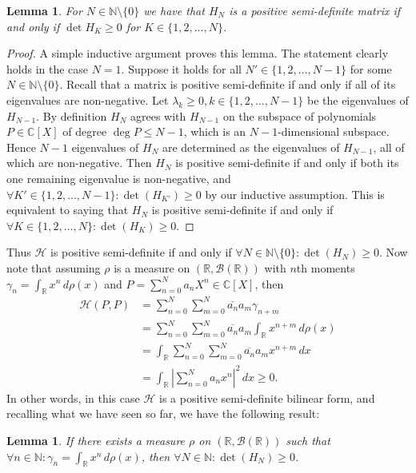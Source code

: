 \documentclass[12pt,oneside]{report}
\newtheorem{lem}[thm]{Lemma}
\begin{document}
\begin{lem}
    For $N \in \mathbb{N} \setminus \{ 0 \}$ we have that $H_{N}$ is a positive semi-definite matrix if and only if $\det H_{K} \geq 0$ for $K \in \{ 1, 2, \dots, N \}$.
\end{lem}
\begin{proof}
    A simple inductive argument proves this lemma. The statement clearly holds in the case $N = 1$. Suppose it holds for all $N' \in \{ 1,2,\dots,N-1 \}$ for some $N \in \mathbb{N} \setminus \{ 0 \}$. Recall that a matrix is positive semi-definite if and only if all of its eigenvalues are non-negative. Let $\lambda_{k} \geq 0, k \in \{ 1,2,\dots,N-1 \}$ be the eigenvalues of $H_{N-1}$. By definition $H_{N}$ agrees with $H_{N-1}$ on the subspace of polynomials $P \in \mathbb{C}[X]$ of degree $\deg P \leq N-1$, which is an $N-1$-dimensional subspace. Hence $N-1$ eigenvalues of $H_{N}$ are determined as the eigenvalues of $H_{N-1}$, all of which are non-negative. Then $H_{N}$ is positive semi-definite if and only if both its one remaining eigenvalue is non-negative, and $\forall K' \in \{ 1,2,\dots,N-1 \}: \det (H_{K'}) \geq 0$ by our inductive assumption. This is equivalent to saying that $H_{N}$ is positive semi-definite if and only if $\forall K \in \{ 1,2,\dots,N \}: \det(H_{K}) \geq 0$.
\end{proof}

Thus $\mathcal{H}$ is positive semi-definite if and only if $\forall N \in \mathbb{N} \setminus \{ 0 \}: \det(H_{N}) \geq 0$. Now note that assuming $\rho$ is a measure on $(\mathbb{R}, \mathcal{B}(\mathbb{R}))$ with $n$th moments $\gamma_{n} = \int _{\mathbb{R}} x^{n} \, d\rho(x)$ and $P = \sum_{n=0}^{N} a_{n}X^{n} \in \mathbb{C}[X]$, then
\begin{align}
\mathcal{H}(P,P) &= \sum_{n=0}^{N} \sum_{m=0}^{N} \overline{a_{n}}a_{m} \gamma_{n+m}  \\
&= \sum_{n=0}^{N} \sum_{m=0}^{N} \overline{a_{n}}a_{m} \int _{\mathbb{R}} x^{n+m} \, d\rho(x) \\
&= \int _{\mathbb{R}} \sum_{n=0}^{N} \sum_{m=0}^{N} \overline{a_{n}}a_{m} x^{n+m} \, dx \\
&= \int _{\mathbb{R}} \left| \sum_{n=0}^{N} a_{n} x^{n} \right|^{2} \, dx \geq 0.
\end{align}
In other words, in this case $\mathcal{H}$ is a positive semi-definite bilinear form, and recalling what we have seen so far, we have the following result:

\begin{lem}
    If there exists a measure $\rho$ on $(\mathbb{R}, \mathcal{B}(\mathbb{R}))$ such that $\forall n \in \mathbb{N}: \gamma_{n} = \int _{\mathbb{R}} x^{n} \, d\rho(x)$, then $\forall N \in \mathbb{N}: \det(H_{N}) \geq 0$.
\end{lem}
\end{document}
